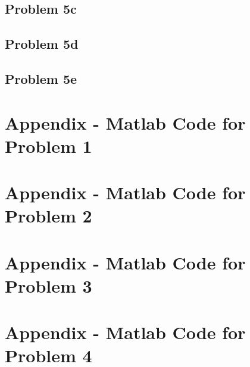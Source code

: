 \subsection*{Problem 5c}

\subsection*{Problem 5d}

\subsection*{Problem 5e}






\newpage
\section{Appendix - Matlab Code for Problem 1}
\label{appendix:problem1}





\newpage
\section{Appendix - Matlab Code for Problem 2}
\label{appendix:problem2}





\newpage
\section{Appendix - Matlab Code for Problem 3}
\label{appendix:problem3}





\newpage
\section{Appendix - Matlab Code for Problem 4}
\label{appendix:problem4}

